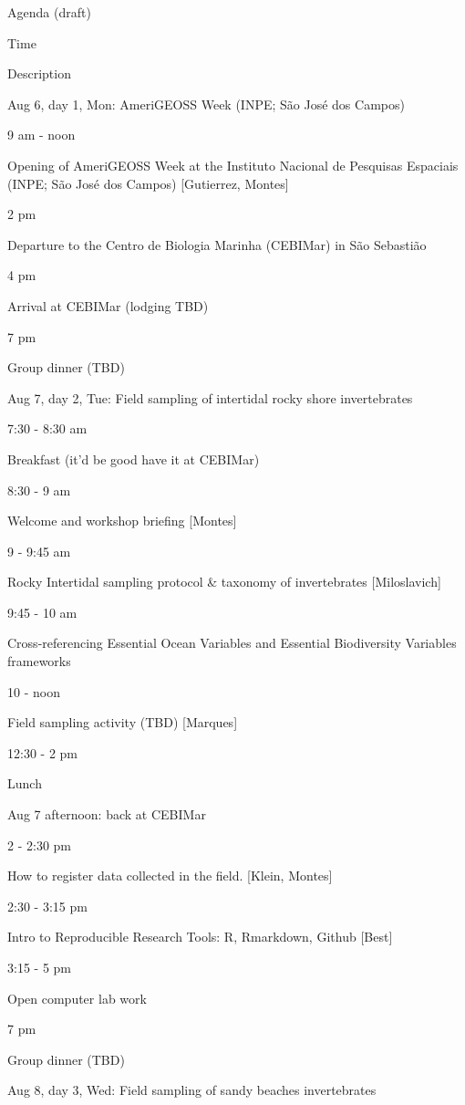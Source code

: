 \documentclass[]{book}
\theoremstyle{definition}
\theoremstyle{definition}
\theoremstyle{definition}
\theoremstyle{remark}
\begin{document}
\label{tab:unnamed-chunk-3}Agenda (draft)

Time

Description

Aug 6, day 1, Mon: AmeriGEOSS Week (INPE; São José dos Campos)

9 am - noon

Opening of AmeriGEOSS Week at the Instituto Nacional de Pesquisas
Espaciais (INPE; São José dos Campos) {[}Gutierrez, Montes{]}

2 pm

Departure to the Centro de Biologia Marinha (CEBIMar) in São Sebastião

4 pm

Arrival at CEBIMar (lodging TBD)

7 pm

Group dinner (TBD)

Aug 7, day 2, Tue: Field sampling of intertidal rocky shore
invertebrates

7:30 - 8:30 am

Breakfast (it'd be good have it at CEBIMar)

8:30 - 9 am

Welcome and workshop briefing {[}Montes{]}

9 - 9:45 am

Rocky Intertidal sampling protocol \& taxonomy of invertebrates
{[}Miloslavich{]}

9:45 - 10 am

Cross-referencing Essential Ocean Variables and Essential Biodiversity
Variables frameworks

10 - noon

Field sampling activity (TBD) {[}Marques{]}

12:30 - 2 pm

Lunch

Aug 7 afternoon: back at CEBIMar

2 - 2:30 pm

How to register data collected in the field. {[}Klein, Montes{]}

2:30 - 3:15 pm

Intro to Reproducible Research Tools: R, Rmarkdown, Github {[}Best{]}

3:15 - 5 pm

Open computer lab work

7 pm

Group dinner (TBD)

Aug 8, day 3, Wed: Field sampling of sandy beaches invertebrates
\end{document}
